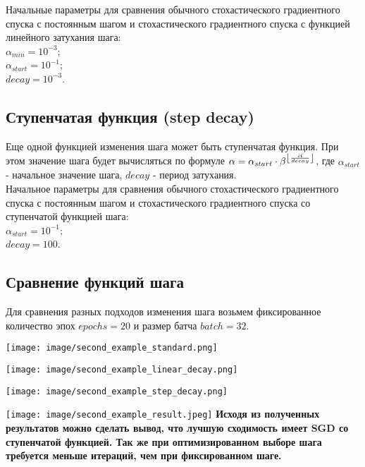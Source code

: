 \documentclass{article}
\DeclarePairedDelimiter\floor{\lfloor}{\rfloor}
\begin{document}
\noindent Начальные параметры для сравнения обычного стохастического градиентного спуска с
постоянным шагом и стохастического градиентного спуска с функцией линейного затухания шага: \\
$\alpha_{min} = 10^{-3}$; \\
$\alpha_{start} = 10^{-1}$; \\
$decay = 10^{-3}$.

\subsection*{Ступенчатая функция (step decay)}
Еще одной функцией изменения шага может быть ступенчатая функция. При этом значение шага будет вычисляться по формуле $\alpha = \alpha_{start} \cdot \beta^{\floor*{\frac{it}{decay}}}$, где $\alpha_{start}$ - начальное значение шага, $decay$ - период затухания. \\

\noindent Начальное параметры для сравнения обычного стохастического градиентного спуска с
постоянным шагом и стохастического градиентного спуска со ступенчатой функцией шага: \\
$\alpha_{start} = 10^{-1}$; \\
$decay = 100$.

\subsection*{Сравнение функций шага}
Для сравнения разных подходов изменения шага возьмем фиксированное количество эпох $epochs = 20$ и размер батча $batch = 32$.
\begin{center}
    \texttt{[image: image/second\_example\_standard.png]}
    \label{fig:enter-label}
\end{center}
\begin{center}
    \texttt{[image: image/second\_example\_linear\_decay.png]}
    \label{fig:enter-label}
\end{center}
\begin{center}
    \texttt{[image: image/second\_example\_step\_decay.png]}
    \label{fig:enter-label}
\end{center}
\texttt{[image: image/second\_example\_result.jpeg]}
\textbf{Исходя из полученных результатов можно сделать вывод, что лучшую сходимость имеет SGD  со ступенчатой функцией. Так же при оптимизированном выборе шага требуется меньше итераций, чем при фиксированном шаге.}
\end{document}
